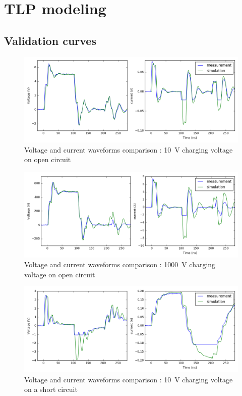 \chapter{TLP modeling}
\section{Validation curves}
\label{apx:tlp-validation-curves}

\begin{figure}[!h]
  \centering
  \includegraphics[width=\textwidth]{src/2/figures/tlp_comparison_open_10V.png}
  \caption{Voltage and current waveforms comparison : \SI{10}{\volt} charging voltage on open circuit}
  \label{fig:comparison-tlp-open-10v}
\end{figure}

\begin{figure}[!h]
  \centering
  \includegraphics[width=\textwidth]{src/2/figures/tlp_comparison_open_1000V.png}
  \caption{Voltage and current waveforms comparison : \SI{1000}{\volt} charging voltage on open circuit}
  \label{fig:comparison-tlp-open-1000V}
\end{figure}

\begin{figure}[!h]
  \centering
  \includegraphics[width=\textwidth]{src/2/figures/tlp_comparison_short_10V.png}
  \caption{Voltage and current waveforms comparison : \SI{10}{\volt} charging voltage on a short circuit}
  \label{fig:comparison-tlp-short-10V}
\end{figure}

